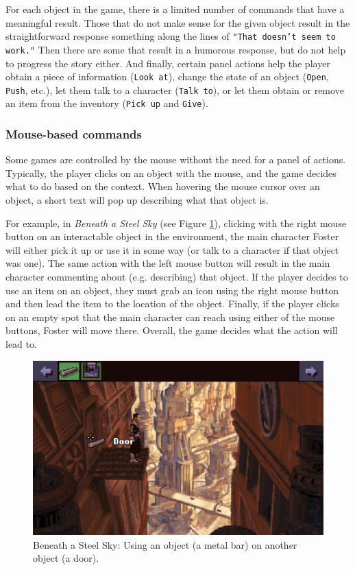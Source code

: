 For each object in the game, there is a limited number of commands that have a meaningful result. Those that do not make sense for the given object result in the straightforward response something along the lines of \texttt{"That doesn't seem to work."} Then there are some that result in a humorous response, but do not help to progress the story either. And finally, certain panel actions help the player obtain a piece of information (\texttt{Look at}), change the state of an object (\texttt{Open}, \texttt{Push}, etc.), let them talk to a character (\texttt{Talk to}), or let them obtain or remove an item from the inventory (\texttt{Pick up} and \texttt{Give}).

\subsubsection{Mouse-based commands}
Some games are controlled by the mouse without the need for a panel of actions. Typically, the player clicks on an object with the mouse, and the game decides what to do based on the context. When hovering the mouse cursor over an object, a short text will pop up describing what that object is.

For example, in \textit{Beneath a Steel Sky} (see Figure \ref{fig:C-BaSS}), clicking with the right mouse button on an interactable object in the environment, the main character Foster will either pick it up or use it in some way (or talk to a character if that object was one). The same action with the left mouse button will result in the main character commenting about (e.g. describing) that object. If the player decides to use an item on an object, they must grab an icon using the right mouse button and then lead the item to the location of the object. Finally, if the player clicks on an empty spot that the main character can reach using either of the mouse buttons, Foster will move there. Overall, the game decides what the action will lead to.

\begin{figure}[H]
\centering
\includegraphics[width=.8\linewidth]{img/C-BaSS.png}
\caption{Beneath a Steel Sky: Using an object (a metal bar) on another object (a door).}
\label{fig:C-BaSS}
\end{figure}

